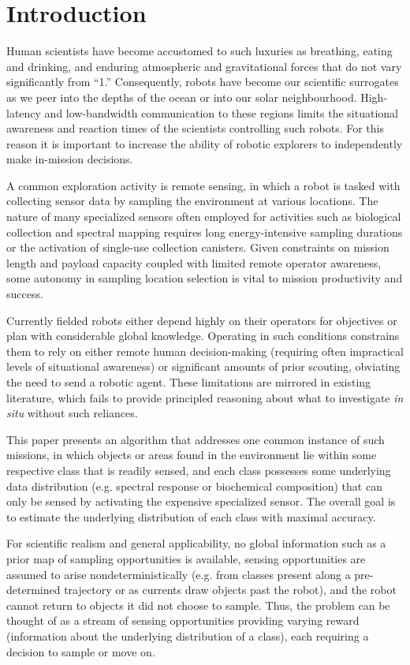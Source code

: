 \section{Introduction}
\label{sec:intro}

Human scientists have become accustomed to such luxuries as breathing, eating
and drinking, and enduring atmospheric and gravitational forces that do not
vary significantly from ``1.''  Consequently, robots have become our scientific
surrogates as we peer into the depths of the ocean or into our solar
neighbourhood.  High-latency and low-bandwidth communication to these regions limits the situational awareness and reaction times of the scientists controlling such robots.  For this reason it is important to increase the ability of robotic explorers to independently make in-mission decisions.

A common exploration activity is remote sensing, in which a robot is tasked with collecting sensor data by sampling the environment at various locations.  The nature of many specialized sensors often employed for activities such as biological collection and spectral mapping requires long energy-intensive sampling durations or the activation of single-use collection canisters.  Given constraints on mission length and payload capacity coupled with limited remote operator awareness, some autonomy in sampling location selection is vital to mission productivity and success.

Currently fielded robots either depend highly on their operators for objectives or plan with considerable global knowledge.  Operating in such conditions constrains them to rely on either remote human decision-making (requiring often impractical levels of situational awareness) or significant amounts of prior scouting, obviating the need to send a robotic agent.  These limitations are mirrored in existing literature, which fails to provide principled reasoning about what to investigate \emph{in situ} without such reliances.

This paper presents an algorithm that addresses one common instance of such missions, in which objects or areas found in the environment lie within some respective class that is readily sensed, and each class possesses some underlying data distribution (e.g. spectral response or biochemical composition) that can only be sensed by activating the expensive specialized sensor.  The overall goal is to estimate the underlying distribution of each class with maximal accuracy.

For scientific realism and general applicability, no global information such as a prior map of sampling opportunities is available, sensing opportunities are assumed to arise nondeterministically (e.g. from classes present along a pre-determined trajectory or as currents draw objects past the robot), and the robot cannot return to objects it did not choose to sample.  Thus, the problem can be thought of as a stream of sensing opportunities providing varying reward (information about the underlying distribution of a class), each requiring a decision to sample or move on.

